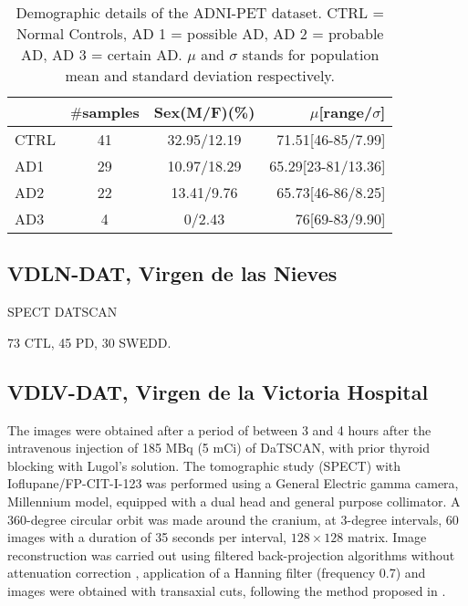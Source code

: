\begin{table}
	\begin{center}
		\begin{tabular}{lccr}
			\hline
			\hline
			& $\#$samples & Sex(M/F)(\%) & $\mu$[range/$\sigma$] \\
			\hline \hline
			CTRL  & 41 & 32.95/12.19 & 71.51[46-85/7.99]\\
			AD1     & 29 & 10.97/18.29 &65.29[23-81/13.36]\\
			AD2     & 22 & 13.41/9.76  &65.73[46-86/8.25]\\
			AD3     & 4  & 0/2.43      &76[69-83/9.90]\\
			\hline \hline
		\end{tabular}
		\caption[Demographic details of the ADNI-PET dataset.]{Demographic details of the ADNI-PET dataset. CTRL = Normal Controls, AD 1 = possible AD, AD 2 = probable AD, AD 3 = certain AD. $\mu$ and $\sigma$ stands for population mean and standard deviation respectively.}
		\label{tab:bd}
	\end{center}
\end{table}

\subsection{VDLN-DAT, Virgen de las Nieves}\label{sec:vdlndat}
SPECT DATSCAN


73 CTL, 45 PD, 30 SWEDD. 

\subsection{VDLV-DAT, Virgen de la Victoria Hospital}\label{sec:vdlvdat}
The images were obtained after a period of between 3 and 4 hours after the intravenous injection of 185 MBq (5 mCi) of DaTSCAN, with prior thyroid blocking with Lugol's solution. The tomographic study (SPECT) with Ioflupane/FP-CIT-I-123 was performed using a General Electric gamma camera, Millennium model, equipped with a dual head and general purpose collimator. A 360-degree circular orbit was made around the cranium, at 3-degree intervals, 60 images with a duration of 35 seconds per interval, $128\times128$ matrix. Image reconstruction was carried out using filtered back-projection algorithms without attenuation correction \cite{Shepp82,Vardi1985}, application of a Hanning filter (frequency 0.7) and images were obtained with transaxial cuts, following the method proposed in \cite{Ramirez2009}. 


